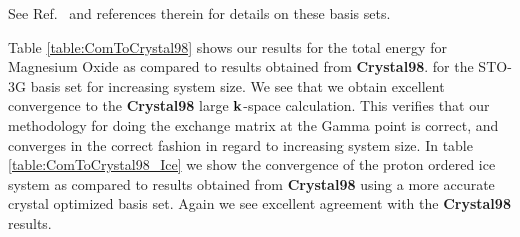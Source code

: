 \documentclass[prb,aps,nobibnotes,twocolumn,doublespace,twocolumngrid,superbib]{revtex4}
\begin{document}
See Ref.~\cite{MTowlerBasis} and references therein for details on these basis sets. 

Table \ref{table:ComToCrystal98} shows our results for the total
energy for Magnesium Oxide as compared to results obtained from \textbf{Crystal98}.
for the STO-3G basis set for increasing system size. We see that we obtain excellent
convergence to the {\bf Crystal98} large ${\bf k}$-space calculation. This verifies that
our methodology for doing the exchange matrix at the Gamma point is correct, and converges 
in the correct fashion in regard to increasing system size. In table \ref{table:ComToCrystal98_Ice}
we show the convergence of the proton ordered ice system as compared to results obtained from 
\textbf{Crystal98} using a more accurate crystal optimized basis set. Again we see excellent
agreement with the \textbf{Crystal98} results.
\end{document}
